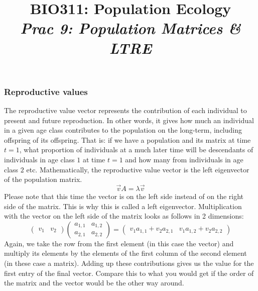 \documentclass{article}\usepackage[]{graphicx}\usepackage[]{color}
\title{BIO311: Population Ecology\\ \textit{Prac 9: Population Matrices \& LTRE}}
\begin{document}




\maketitle
\tableofcontents
\vspace{3cm}
\newpage

\subsubsection{Reproductive values}\label{Newfrhere}
The reproductive value vector represents the contribution of each individual to present and future reproduction. In other words, it gives how much an individual in a given age class contributes to the population on the long-term, including offspring of its offspring. That is: if we have a population and its matrix at time $t=1$, what proportion of individuals at a much later time will be descendants of individuals in age class $1$ at time $t=1$ and how many from individuals in age class $2$ etc. Mathematically, the reproductive value vector is the left eigenvector of the population matrix.
\begin{equation}
\vec{v}A=\lambda \vec{v}
\end{equation}
Please note that this time the vector is on the left side instead of on the right side of the matrix. This is why this is called a left eigenvector. Multiplication with the vector on the left side of the matrix looks as follows in 2 dimensions:
\begin{equation}
\begin{pmatrix} v_1 & v_2 \end{pmatrix} \begin{pmatrix} a_{1,1} & a_{1,2}\\ a_{2,1} & a_{2,2} \end{pmatrix} = \begin{pmatrix} v_1 a_{1,1} + v_2 a_{2,1} & v_1 a_{1,2} + v_2 a_{2,2} \end{pmatrix}
\end{equation}
Again, we take the row from the first element (in this case the vector) and multiply its elements by the elements of the first column of the second element (in these case a matrix). Adding up these contributions gives us the value for the first entry of the final vector. Compare this to what you would get if the order of the matrix and the vector would be the other way around.
\end{document}
